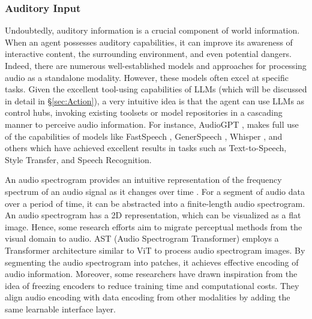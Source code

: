 \subsubsection{Auditory Input}\label{sec:Auditory Input}
Undoubtedly, auditory information is a crucial component of world information. When an agent possesses auditory capabilities, it can improve its awareness of interactive content, the surrounding environment, and even potential dangers. Indeed, there are numerous well-established models and approaches  \cite{DBLP:journals/corr/abs-2304-12995,DBLP:conf/icml/RadfordKXBMS23,DBLP:conf/nips/RenRTQZZL19} for processing audio as a standalone modality. However, these models often excel at specific tasks. Given the excellent tool-using capabilities of LLMs (which will be discussed in detail in \S \ref{sec:Action}), a very intuitive idea is that the agent can use LLMs as control hubs, invoking existing toolsets or model repositories in a cascading manner to perceive audio information. For instance, AudioGPT \cite{DBLP:journals/corr/abs-2304-12995}, makes full use of the capabilities of models like FastSpeech \cite{DBLP:conf/nips/RenRTQZZL19}, GenerSpeech  \cite{DBLP:conf/icml/RadfordKXBMS23}, Whisper \cite{DBLP:conf/icml/RadfordKXBMS23}, and others \cite{DBLP:conf/ijcai/YeZ0022,DBLP:conf/icml/KimKS21,DBLP:journals/taslp/WangCCLKW23,DBLP:conf/aaai/Liu00CZ22,DBLP:conf/asru/InagumaDYW21} which have achieved excellent results in tasks such as Text-to-Speech, Style Transfer, and Speech Recognition.

An audio spectrogram provides an intuitive representation of the frequency spectrum of an audio signal as it changes over time \cite{flanagan2013speech}. For a segment of audio data over a period of time, it can be abstracted into a finite-length audio spectrogram. An audio spectrogram has a 2D representation, which can be visualized as a flat image. Hence, some research \cite{DBLP:conf/interspeech/GongCG21,DBLP:journals/taslp/HsuBTLSM21} efforts aim to migrate perceptual methods from the visual domain to audio. AST (Audio Spectrogram Transformer) \cite{DBLP:conf/interspeech/GongCG21} employs a Transformer architecture similar to ViT to process audio spectrogram images. By segmenting the audio spectrogram into patches, it achieves effective encoding of audio information. Moreover, some researchers \cite{DBLP:journals/corr/abs-2305-04160,DBLP:journals/corr/abs-2306-02858} have drawn inspiration from the idea of freezing encoders to reduce training time and computational costs. They align audio encoding with data encoding from other modalities by adding the same learnable interface layer.


